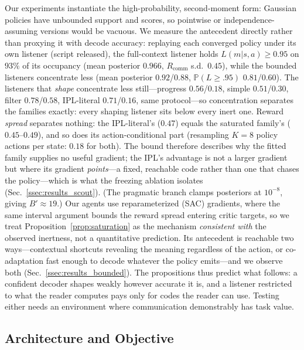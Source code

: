 \documentclass[sigconf,review,anonymous]{acmart}
\newcommand{\Rcomm}{R_{\text{comm}}}
\begin{document}
Our experiments instantiate the high-probability, second-moment form: Gaussian policies have unbounded support and scores, so pointwise or independence-assuming versions would be vacuous. We measure the antecedent directly rather than proxying it with decode accuracy: replaying each converged policy under its own listener (script released), the full-context listener holds $L(m|s,a) \geq 0.95$ on $93\%$ of its occupancy (mean posterior $0.966$, $\Rcomm$ s.d.\ $0.45$), while the bounded listeners concentrate less (mean posterior $0.92$/$0.88$, $\mathbb{P}(L{\ge}.95)$ $0.81$/$0.60$). The listeners that \emph{shape} concentrate less still---progress $0.56$/$0.18$, simple $0.51$/$0.30$, filter $0.78$/$0.58$, IPL-literal $0.71$/$0.16$, same protocol---so concentration separates the families exactly: every shaping listener sits below every inert one. Reward \emph{spread} separates nothing: the IPL-literal's ($0.47$) equals the saturated family's ($0.45$--$0.49$), and so does its action-conditional part (resampling $K{=}8$ policy actions per state: $0.18$ for both). The bound therefore describes why the fitted family supplies no useful gradient; the IPL's advantage is not a larger gradient but where its gradient \emph{points}---a fixed, reachable code rather than one that chases the policy---which is what the freezing ablation isolates (Sec.~\ref{ssec:results_scout}). (The pragmatic branch clamps posteriors at $10^{-8}$, giving $B' \approx 19$.) Our agents use reparameterized (SAC) gradients, where the same interval argument bounds the reward spread entering critic targets, so we treat Proposition~\ref{prop:saturation} as the mechanism \emph{consistent with} the observed inertness, not a quantitative prediction. Its antecedent is reachable two ways---contextual shortcuts revealing the meaning regardless of the action, or co-adaptation fast enough to decode whatever the policy emits---and we observe both (Sec.~\ref{ssec:results_bounded}). The propositions thus predict what follows: a confident decoder shapes weakly however accurate it is, and a listener restricted to what the reader computes pays only for codes the reader can use. Testing either needs an environment where communication demonstrably has task value.

\subsection{Architecture and Objective}
\label{ssec:bellman}
\end{document}
